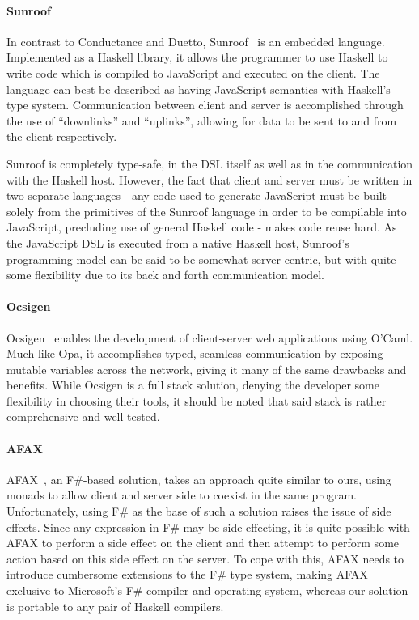 \documentclass[preprint]{sigplanconf}
\begin{document}
\paragraph{Sunroof} In contrast to Conductance and Duetto,
Sunroof\ \cite{sunroof} is an embedded language. Implemented as a Haskell
library, it allows the programmer to use Haskell to write code which is
compiled to JavaScript and executed on the client. The language can best be
described as having JavaScript semantics with Haskell's type system.
Communication between client and server is accomplished through the use
of ``downlinks'' and ``uplinks'', allowing for data to be sent to and from the
client respectively.

Sunroof is completely type-safe, in the DSL itself as well as in the
communication with the Haskell host. However, the fact that client and server
must be written in two separate languages - any code used to generate
JavaScript must be built solely from the primitives of the Sunroof
language in order to be compilable into JavaScript, precluding use of general
Haskell code - makes code reuse hard. As the JavaScript DSL is executed from
a native Haskell host, Sunroof's programming model can be said to be somewhat
server centric, but with quite some flexibility due to its back and forth
communication model.

\paragraph{Ocsigen} Ocsigen\ \cite{ocsigen} enables the development of
client-server web applications using O'Caml. Much like Opa, it accomplishes
typed, seamless communication by exposing mutable variables across the network,
giving it many of the same drawbacks and benefits. While Ocsigen is a full
stack solution, denying the developer some flexibility in choosing their tools,
it should be noted that said stack is rather comprehensive and well tested.

\paragraph{AFAX} AFAX\ \cite{afax}, an F\#-based solution, takes an approach
quite similar to ours, using monads to allow client and server side to coexist
in the same program. Unfortunately, using F\# as the base of such a solution
raises the issue of side effects. Since any expression in F\# may be side
effecting, it is quite possible with AFAX to perform a side effect on the client
and then attempt to perform some action based on this side effect on the server.
To cope with this, AFAX needs to introduce cumbersome extensions to the F\#
type system, making AFAX exclusive to Microsoft's F\# compiler and operating
system, whereas our solution is portable to any pair of Haskell compilers.
\end{document}
